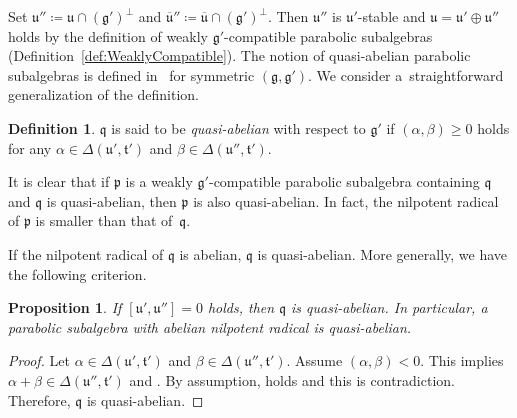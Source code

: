 \documentclass[10pt,a4paper]{amsart}
\numberwithin{equation}{section}
\newtheorem{Proposition}[Theorem]{Proposition}
\theoremstyle{definition}
\newtheorem{Definition}[Theorem]{Definition}
\newcommand{\lie}[1]{\mathfrak{#1}}
\begin{document}
Set $\lie{u}''\coloneq \lie{u} \cap (\lie{g}')^\perp$ and $\lie{\overline{u}}''\coloneq \lie{\overline{u}} \cap (\lie{g}')^\perp$.
Then $\lie{u}''$ is $\lie{u}'$-stable and $\lie{u} = \lie{u}' \oplus \lie{u}''$ holds by the definition of weakly $\lie{g'}$-compatible parabolic subalgebras (Definition~\ref{def:WeaklyCompatible}).
The notion of quasi-abelian parabolic subalgebras is defined in~\cite[p.~109]{EnPaWaWo85} for symmetric $(\lie{g}, \lie{g'})$.
We consider a~straightforward generalization of the definition.

\begin{Definition}\label{def:QuasiAbelian}
	$\lie{q}$ is said to be \emph{quasi-abelian} with respect to $\lie{g'}$ if
	$(\alpha, \beta)\geq 0$ holds for any $\alpha \in \Delta(\lie{u'}, \lie{t'})$ and $\beta \in \Delta(\lie{u''}, \lie{t'})$.
\end{Definition}

It is clear that if $\lie{p}$ is a weakly $\lie{g'}$-compatible parabolic subalgebra containing $\lie{q}$ and $\lie{q}$ is quasi-abelian, then $\lie{p}$ is also quasi-abelian.
In fact, the nilpotent radical of $\lie{p}$ is smaller than that of~$\lie{q}$.

If the nilpotent radical of $\lie{q}$ is abelian, $\lie{q}$ is quasi-abelian.
More generally, we have the following criterion.

\begin{Proposition}\label{prop:QuasiAbelianCondition}
	If $[\lie{u}', \lie{u}'']=0$ holds, then $\lie{q}$ is quasi-abelian.
	In particular, a parabolic subalgebra with abelian nilpotent radical is quasi-abelian.
\end{Proposition}
	
\begin{proof}
	Let $\alpha \in \Delta(\lie{u'}, \lie{t'})$ and $\beta \in \Delta(\lie{u''}, \lie{t'})$.
	Assume $(\alpha, \beta) < 0$.
	This implies $\alpha + \beta \in \Delta(\lie{u''}, \lie{t'})$
	and \smash{$\bigl[\lie{u}'_{\alpha}, \lie{u}''_{\beta}\bigr]\neq 0$}.
	By assumption, \smash{$\bigl[\lie{u}'_{\alpha}, \lie{u}''_{\beta}\bigr]\subset [\lie{u}', \lie{u}'']=0$} holds and this is contradiction.
	Therefore, $\lie{q}$ is quasi-abelian.
\end{proof}
\end{document}
